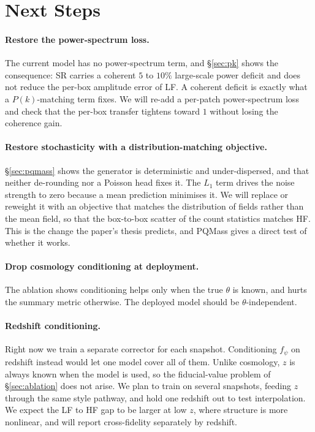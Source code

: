 \documentclass{article} %
\begin{document}
\section{Next Steps}

\paragraph{Restore the power-spectrum loss.} The current model has no
power-spectrum term, and \S\ref{sec:pk} shows the consequence: SR carries a
coherent $5$ to $10\%$ large-scale power deficit and does not reduce the per-box
amplitude error of LF. A coherent deficit is exactly what a $P(k)$-matching term
fixes. We will re-add a per-patch power-spectrum loss and check that the per-box
transfer tightens toward $1$ without losing the coherence gain.

\paragraph{Restore stochasticity with a distribution-matching objective.}
\S\ref{sec:pqmass} shows the generator is deterministic and under-dispersed, and
that neither de-rounding nor a Poisson head fixes it. The $L_1$ term drives the
noise strength to zero because a mean prediction minimises it. We will replace or
reweight it with an objective that matches the distribution of fields rather than
the mean field, so that the box-to-box scatter of the count statistics matches HF.
This is the change the paper's thesis predicts, and PQMass gives a direct test of
whether it works.

\paragraph{Drop cosmology conditioning at deployment.} The ablation shows
conditioning helps only when the true $\theta$ is known, and hurts the summary
metric otherwise. The deployed model should be $\theta$-independent.

\paragraph{Redshift conditioning.} Right now we train a separate corrector for each
snapshot. Conditioning $f_\psi$ on redshift instead would let one model cover all
of them. Unlike cosmology, $z$ is always known when the model is used, so the
fiducial-value problem of \S\ref{sec:ablation} does not arise. We plan to train on
several snapshots, feeding $z$ through the same style pathway, and hold one redshift
out to test interpolation. We expect the LF to HF gap to be larger at low $z$, where
structure is more nonlinear, and will report cross-fidelity separately by redshift.
\end{document}
